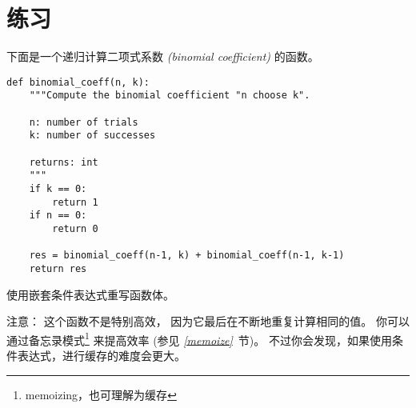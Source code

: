 \section{练习}

\begin{exercise}


下面是一个递归计算二项式系数 {\em (binomial coefficient)} 的函数。

\begin{em}
\begin{lstlisting}
def binomial_coeff(n, k):
    """Compute the binomial coefficient "n choose k".

    n: number of trials
    k: number of successes

    returns: int
    """
    if k == 0:
        return 1
    if n == 0:
        return 0

    res = binomial_coeff(n-1, k) + binomial_coeff(n-1, k-1)
    return res
\end{lstlisting}
\end{em}


使用嵌套条件表达式重写函数体。


注意： 这个函数不是特别高效， 因为它最后在不断地重复计算相同的值。
你可以通过备忘录模式\footnote{memoizing，也可理解为缓存} 来提高效率
(参见 {\em \ref{memoize}}~节)。
不过你会发现，如果使用条件表达式，进行缓存的难度会更大。

\end{exercise}